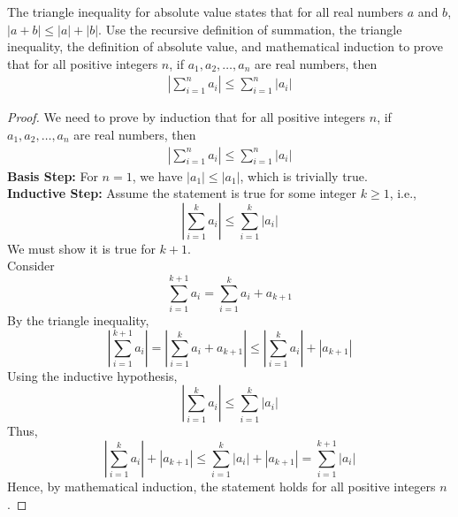 \documentclass[name=Ojas\ Chaturvedi, emailid=oj.chaturvedi.2024, course=Capstone:\ Discrete\ Math, num=9, deadline={November\ 17,\ 2023}]{homework}
\begin{document}
    The triangle inequality for absolute value states that for all real numbers $a$ and $b$, $|a + b| \leq |a| + |b|$. Use the recursive definition of summation, the triangle inequality, the definition of absolute value, and mathematical induction to prove that for all positive integers $n$, if $a_1, a_2, \ldots, a_n$ are real numbers, then
    \begin{align*}
        \left|\sum_{i=1}^{n}a_i \right| \leq \sum_{i=1}^{n}|a_i|
    \end{align*}
\begin{proof}
    We need to prove by induction that for all positive integers $n$, if $a_1, a_2, \ldots, a_n$ are real numbers, then
    \begin{align*}
        \left|\sum_{i=1}^{n}a_i \right| \leq \sum_{i=1}^{n}|a_i|
    \end{align*}
    \textbf{Basis Step:}
    For $n = 1$, we have $|a_1| \leq |a_1|$, which is trivially true. \\
    \textbf{Inductive Step:}
    Assume the statement is true for some integer $k \geq 1$, i.e., 
    \[ \left|\sum_{i=1}^{k}a_i \right| \leq \sum_{i=1}^{k}|a_i| \]
    We must show it is true for $k + 1$. \\
    Consider
    \[ \sum_{i=1}^{k+1}a_i = \sum_{i=1}^{k}a_i + a_{k+1} \]
    By the triangle inequality,
    \[ \left|\sum_{i=1}^{k+1}a_i \right| = \left|\sum_{i=1}^{k}a_i + a_{k+1}\right| \leq \left|\sum_{i=1}^{k}a_i\right| + |a_{k+1}| \]
    Using the inductive hypothesis,
    \[ \left|\sum_{i=1}^{k}a_i\right| \leq \sum_{i=1}^{k}|a_i| \]
    Thus,
    \[ \left|\sum_{i=1}^{k}a_i\right| + |a_{k+1}| \leq \sum_{i=1}^{k}|a_i| + |a_{k+1}| = \sum_{i=1}^{k+1}|a_i| \]
    Hence, by mathematical induction, the statement holds for all positive integers $n$.
\end{proof}
\end{document}
